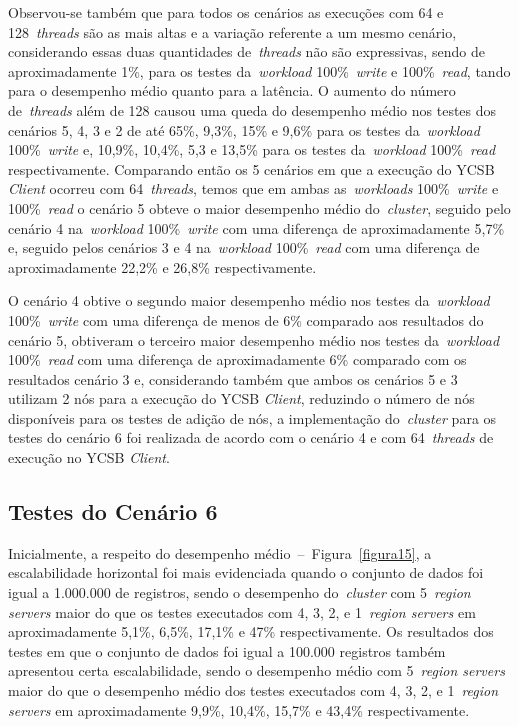 \documentclass[12pt]{article}
\begin{document}
Observou-se também que para todos os cenários as execuções com 64 e 128~\emph{threads} são as mais altas e a variação referente a um mesmo cenário, considerando essas duas quantidades de~\emph{threads} não são expressivas, sendo de aproximadamente 1\%, para os testes da~\emph{workload} 100\%~\emph{write} e 100\%~\emph{read}, tando para o desempenho médio quanto para a latência. O aumento do número de~\emph{threads} além de 128 causou uma queda do desempenho médio nos testes dos cenários 5, 4, 3 e 2 de até 65\%, 9,3\%, 15\% e 9,6\% para os testes da~\emph{workload} 100\%~\emph{write} e, 10,9\%, 10,4\%, 5,3 e 13,5\% para os testes da~\emph{workload} 100\%~\emph{read} respectivamente. Comparando então os 5 cenários em que a execução do YCSB \emph{Client} ocorreu com 64~\emph{threads}, temos que em ambas as~\emph{workloads} 100\%~\emph{write} e 100\%~\emph{read} o cenário 5 obteve o maior desempenho médio do~\emph{cluster}, seguido pelo cenário 4 na~\emph{workload} 100\%~\emph{write} com uma diferença de aproximadamente 5,7\% e, seguido pelos cenários 3 e 4 na~\emph{workload} 100\%~\emph{read} com uma diferença de aproximadamente 22,2\% e 26,8\% respectivamente.

O cenário 4 obtive o segundo maior desempenho médio nos testes da~\emph{workload} 100\%~\emph{write} com uma diferença de menos de 6\% comparado aos resultados do cenário 5, obtiveram o terceiro maior desempenho médio nos testes da~\emph{workload} 100\%~\emph{read} com uma diferença de aproximadamente 6\% comparado com os resultados cenário 3 e, considerando também que ambos os cenários 5 e 3 utilizam 2 nós para a execução do YCSB \emph{Client}, reduzindo o número de nós disponíveis para os testes de adição de nós, a implementação do~\emph{cluster} para os testes do cenário 6 foi realizada de acordo com o cenário 4 e com 64~\emph{threads} de execução no YCSB \emph{Client}.

\subsection{Testes do Cenário 6}
\label{subsec:resultado-cenario-6}

Inicialmente, a respeito do desempenho médio~--~Figura~\ref{figura15}, a escalabilidade horizontal foi mais evidenciada quando o conjunto de dados foi igual a 1.000.000 de registros, sendo o desempenho do~\emph{cluster} com 5~\emph{region servers} maior do que os testes executados com 4, 3, 2, e 1~\emph{region servers} em aproximadamente 5,1\%, 6,5\%, 17,1\% e 47\% respectivamente. Os resultados dos testes em que o conjunto de dados foi igual a 100.000 registros também apresentou certa escalabilidade, sendo o desempenho médio com 5~\emph{region servers} maior do que o desempenho médio dos testes executados com 4, 3, 2, e 1~\emph{region servers} em aproximadamente 9,9\%, 10,4\%, 15,7\% e 43,4\% respectivamente.
\end{document}
